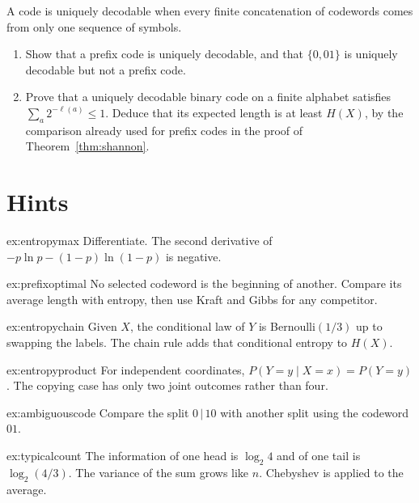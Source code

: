\begin{exercise}[$\star\star$]\label{ex:mcmillan}
A code is uniquely decodable when every finite concatenation of codewords comes from only one sequence of symbols.
\begin{enumerate}[label=(\alph*)]
\item Show that a prefix code is uniquely decodable, and that $\{0,01\}$ is uniquely decodable but not a prefix code.
\item Prove that a uniquely decodable binary code on a finite alphabet satisfies $\sum_a 2^{-\ell(a)}\le1$. Deduce that its expected length is at least $H(X)$, by the comparison already used for prefix codes in the proof of Theorem~\ref{thm:shannon}.
\end{enumerate}
\end{exercise}

\section{Hints}

\begin{hint}{ex:entropymax}
Differentiate. The second derivative of $-p\ln p-(1-p)\ln(1-p)$ is negative.
\end{hint}


\begin{hint}{ex:prefixoptimal}
No selected codeword is the beginning of another. Compare its average length with entropy, then use Kraft and Gibbs for any competitor.
\end{hint}
\begin{hint}{ex:entropychain}
Given $X$, the conditional law of $Y$ is Bernoulli$(1/3)$ up to swapping the labels. The chain rule adds that conditional entropy to $H(X)$.
\end{hint}
\begin{hint}{ex:entropyproduct}
For independent coordinates, $P(Y=y\mid X=x)=P(Y=y)$. The copying case has only two joint outcomes rather than four.
\end{hint}
\begin{hint}{ex:ambiguouscode}
Compare the split $0\,|\,10$ with another split using the codeword $01$.
\end{hint}
\begin{hint}{ex:typicalcount}
The information of one head is $\log_2 4$ and of one tail is $\log_2(4/3)$. The variance of the sum grows like $n$. Chebyshev is applied to the average.
\end{hint}


